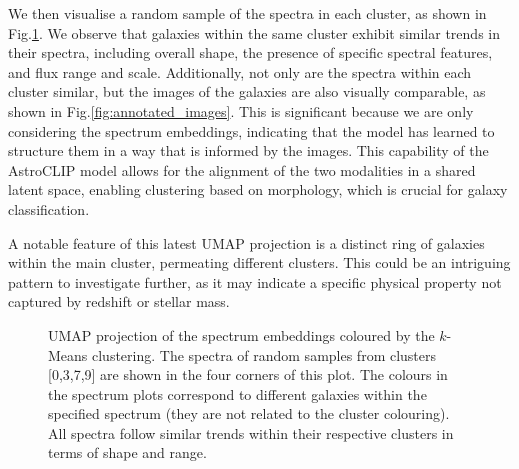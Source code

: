 \documentclass[a4paper,12pt]{article}
\begin{document}
We then visualise a random sample of the spectra in each cluster, as shown in Fig.\ref{fig:annotated_spectra}. We observe that galaxies within the same cluster exhibit similar trends in their spectra, including overall shape, the presence of specific spectral features, and flux range and scale. Additionally, not only are the spectra within each cluster similar, but the images of the galaxies are also visually comparable, as shown in Fig.\ref{fig:annotated_images}. This is significant because we are only considering the spectrum embeddings, indicating that the model has learned to structure them in a way that is informed by the images. This capability of the AstroCLIP model allows for the alignment of the two modalities in a shared latent space, enabling clustering based on morphology, which is crucial for galaxy classification.

A notable feature of this latest UMAP projection is a distinct ring of galaxies within the main cluster, permeating different clusters. This could be an intriguing pattern to investigate further, as it may indicate a specific physical property not captured by redshift or stellar mass.


\begin{figure}[H]
    \centering
    \vspace{-1cm}
    \caption{UMAP projection of the spectrum embeddings coloured by the $k$-Means clustering. The spectra of random samples from clusters [0,3,7,9] are shown in the four corners of this plot. The colours in the spectrum plots correspond to different galaxies within the specified spectrum (they are not related to the cluster colouring). All spectra follow similar trends within their respective clusters in terms of shape and range.}
    \label{fig:annotated_spectra}
\end{figure}
\end{document}
